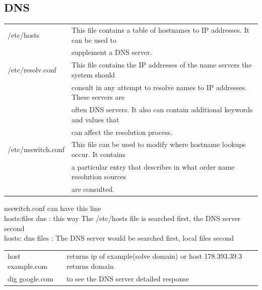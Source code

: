 \documentclass[10pt]{article}
\begin{document}
\subsection{DNS}
\begin{center}
	\begin{tabular}{l l}


		/etc/hosts				&This file contains a table of hostnames to IP addresses. It can be used to\\
								&supplement a DNS server.
		\\/etc/resolv.conf		&This file contains the IP addresses of the name servers the system should\\
								&consult in any attempt to resolve names to IP addresses. These servers are\\
								&often DNS servers. It also can contain additional keywords and values that\\
								&can affect the resolution process.
		\\/etc/nsswitch.conf	&This file can be used to modify where hostname lookups occur. It contains\\
								&a particular entry that describes in what order name resolution sources\\
								&are consulted.\\
	\end{tabular}
\end{center}
nsswitch.conf can have this line\\
hosts:files dns : this way The /etc/hosts file is searched first, the DNS server second\\
hosts: dns files : The DNS server would be searched first, local files second\\
\begin{center}
	\begin{tabular}{l l}
		host example.com &returns ip of example(solve domain) or host 178.393.39.3 returns domain\\
		dig google.com &to see the DNS server detailed response\\
	\end{tabular}
\end{center}
\end{document}
